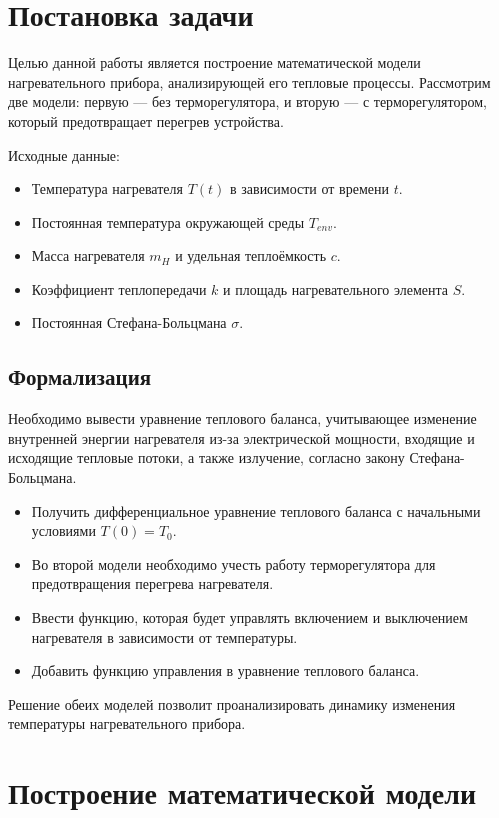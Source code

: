 \chapter{Постановка задачи}
Целью данной работы является построение математической модели нагревательного прибора, анализирующей его тепловые процессы. Рассмотрим две модели: первую — без терморегулятора, и вторую — с терморегулятором, который предотвращает перегрев устройства.

Исходные данные:
\begin{itemize}
	\item Температура нагревателя \( T(t) \) в зависимости от времени \( t \).
	\item Постоянная температура окружающей среды \( T_{env} \).
	\item Масса нагревателя \( m_H \) и удельная теплоёмкость \( c \).
	\item Коэффициент теплопередачи \( k \) и площадь нагревательного элемента \( S \).
	\item Постоянная Стефана-Больцмана \( \sigma \).
\end{itemize}
\section{Формализация}
Необходимо вывести уравнение теплового баланса, учитывающее изменение внутренней энергии нагревателя из-за электрической мощности, входящие и исходящие тепловые потоки, а также излучение, согласно закону Стефана-Больцмана\cite{masalov2016}.
\begin{itemize}
\item Получить дифференциальное уравнение теплового баланса с начальными условиями \( T(0) = T_0 \).

\item Во второй модели необходимо учесть работу терморегулятора для предотвращения перегрева нагревателя.

	\item 	Ввести функцию, которая будет управлять включением и выключением нагревателя в зависимости от температуры.
	
	\item Добавить функцию управления в уравнение теплового баланса.
\end{itemize}

Решение обеих моделей позволит проанализировать динамику изменения температуры нагревательного прибора.
\chapter{Построение математической модели}

